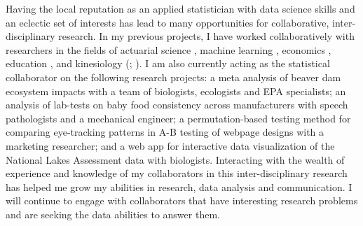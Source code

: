 \documentclass[letterpaper,12pt]{article}\usepackage[]{graphicx}\usepackage[]{color}
\begin{document}
Having the local reputation as an applied statistician with data science skills and an eclectic set of interests has lead to many opportunities for collaborative, inter-disciplinary research. In my previous projects, I have worked collaboratively with researchers in the fields of actuarial science \citep{miljkovic2018examining},  machine learning \citep{maurer2018facility}, economics \citep{anderson2013self}, education \citep{alessio2018impact}, and kinesiology (\citealt{alessio2018international}; \citealt{alessio2017examining}). I am also currently acting as the statistical collaborator on the following research projects: a meta analysis of beaver dam ecosystem impacts with a team of biologists, ecologists and EPA specialists; an analysis of lab-tests on baby food consistency across manufacturers with speech pathologists and a mechanical engineer; a permutation-based testing method for comparing eye-tracking patterns in A-B testing of webpage designs with a marketing researcher; and a web app for interactive data visualization of the National Lakes Assessment data with biologists. Interacting with the wealth of experience and knowledge of my collaborators in this inter-disciplinary research has helped me grow my abilities in research, data analysis and communication. I will continue to engage with collaborators that have interesting research problems and are seeking the data abilities to answer them. 
\end{document}

